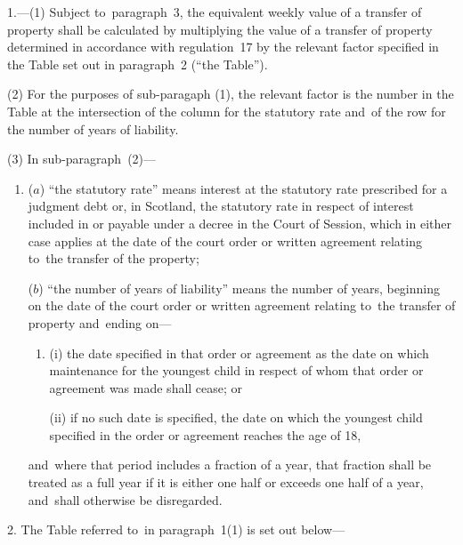 \documentclass[12pt,a4paper]{article}
\begin{document}
\renewcommand\parthead{--- Schedule}

1.---(1)  Subject to~paragraph~3, the equivalent weekly value of a transfer of property shall be calculated by multiplying the value of a transfer of property determined in accordance with regulation~17 by the relevant factor specified in the Table set out in paragraph~2 (“the Table”).

(2) For the purposes of sub-paragaph (1), the relevant factor is the number in the Table at the intersection of the column for the statutory rate and~of the row for the number of years of liability.

(3) In sub-paragraph~(2)—
\begin{enumerate}\item[]
($a$) “the statutory rate” means interest at the statutory rate prescribed for a judgment debt or, in Scotland, the statutory rate in respect of interest included in or payable under a decree in the Court of Session, which in either case applies at the date of the court order or written agreement relating to~the transfer of the property;

($b$) “the number of years of liability” means the number of years, beginning on the date of the court order or written agreement relating to~the transfer of property and~ending on—
\begin{enumerate}\item[]
(i) the date specified in that order or agreement as the date on which maintenance for the youngest child in respect of whom that order or agreement was made shall cease; or

(ii) if no such date is specified, the date on which the youngest child specified in the order or agreement reaches the age of 18,
\end{enumerate}
and~where that period includes a fraction of a year, that fraction shall be treated as a full year if it is either one half or exceeds one half of a year, and~shall otherwise be disregarded.
\end{enumerate}

\medskip

2.  The Table referred to~in paragraph~1(1) is set out below—
\end{document}
